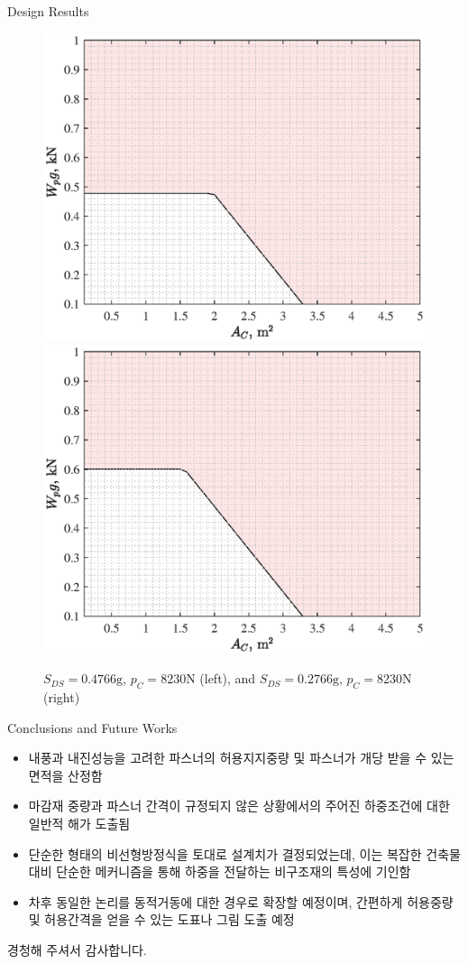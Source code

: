 \documentclass[9pt]{beamer}
\begin{document}
	\begin{frame}{Design Results}
		\begin{figure}
\includegraphics[height=.40\textheight]{Result03}
\includegraphics[height=.40\textheight]{Result04}
\caption{$S_{DS}=0.4766\mathrm g$, $p_C=8230\mathrm N$ (left), and $S_{DS}=0.2766\mathrm g$, $p_C=8230\mathrm N$ (right)}
\end{figure}	
	\end{frame}
	\begin{frame}{Conclusions and Future Works}
\begin{itemize}
	\item 내풍과 내진성능을 고려한 파스너의 허용지지중량 및 파스너가 개당 받을 수 있는 면적을 산정함
	\item 마감재 중량과 파스너 간격이 규정되지 않은 상황에서의 주어진 하중조건에 대한 일반적 해가 도출됨
	\item 단순한 형태의 비선형방정식을 토대로 설계치가 결정되었는데, 이는 복잡한 건축물 대비 단순한 메커니즘을 통해 하중을 전달하는 비구조재의 특성에 기인함
	\item 차후 동일한 논리를 동적거동에 대한 경우로 확장할 예정이며, 간편하게 허용중량 및 허용간격을 얻을 수 있는 도표나 그림 도출 예정
\end{itemize}
	\end{frame}
	\begin{frame}
		경청해 주셔서 감사합니다. 
	\end{frame}
\end{document}
